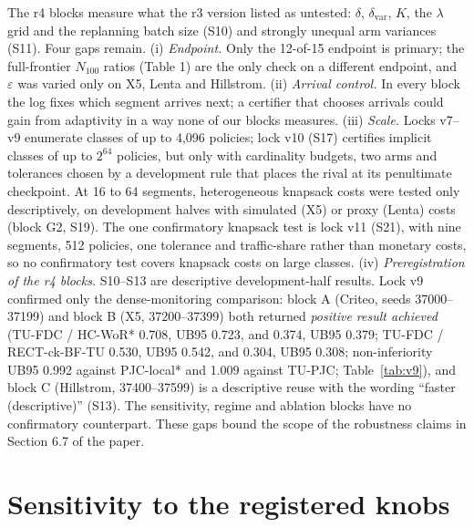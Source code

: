 \documentclass[sigconf,anonymous,review]{acmart}
\newcommand{\eps}{\varepsilon}
\newcommand{\dvar}{\delta_{\text{var}}}
\begin{document}
The r4 blocks measure what the r3 version listed as untested: $\delta$, $\dvar$, $K$, the $\lambda$ grid and the replanning batch size (S10) and strongly unequal arm variances (S11). Four gaps remain. (i) \emph{Endpoint.} Only the 12-of-15 endpoint is primary; the full-frontier $N_{100}$ ratios (Table 1) are the only check on a different endpoint, and $\eps$ was varied only on X5, Lenta and Hillstrom. (ii) \emph{Arrival control.} In every block the log fixes which segment arrives next; a certifier that chooses arrivals could gain from adaptivity in a way none of our blocks measures. (iii) \emph{Scale.} Locks v7--v9 enumerate classes of up to 4,096 policies; lock v10 (S17) certifies implicit classes of up to $2^{64}$ policies, but only with cardinality budgets, two arms and tolerances chosen by a development rule that places the rival at its penultimate checkpoint. At 16 to 64 segments, heterogeneous knapsack costs were tested only descriptively, on development halves with simulated (X5) or proxy (Lenta) costs (block G2, S19). The one confirmatory knapsack test is lock v11 (S21), with nine segments, 512 policies, one tolerance and traffic-share rather than monetary costs, so no confirmatory test covers knapsack costs on large classes. (iv) \emph{Preregistration of the r4 blocks.} S10--S13 are descriptive development-half results. Lock v9 confirmed only the dense-monitoring comparison: block A (Criteo, seeds 37000--37199) and block B (X5, 37200--37399) both returned \emph{positive result achieved} (TU-FDC / HC-WoR* 0.708, UB95 0.723, and 0.374, UB95 0.379; TU-FDC / RECT-ck-BF-TU 0.530, UB95 0.542, and 0.304, UB95 0.308; non-inferiority UB95 0.992 against PJC-local* and 1.009 against TU-PJC; Table~\ref{tab:v9}), and block C (Hillstrom, 37400--37599) is a descriptive reuse with the wording ``faster (descriptive)'' (S13). The sensitivity, regime and ablation blocks have no confirmatory counterpart. These gaps bound the scope of the robustness claims in Section 6.7 of the paper.

\section{Sensitivity to the registered knobs}\label{app:sensE}
\end{document}

